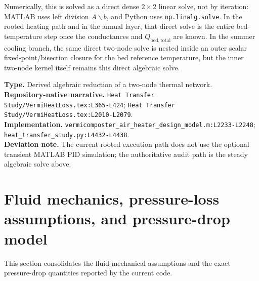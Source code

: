 \documentclass[11pt]{article}
\newcommand{\srcref}[1]{\nolinkurl{#1}}
\newcommand{\filepath}[1]{\nolinkurl{#1}}
\newcommand{\code}[1]{\nolinkurl{#1}}
\begin{document}
Numerically, this is solved as a direct dense \(2\times 2\) linear solve, not by iteration: MATLAB uses left division \(A\backslash b\), and Python uses \code{np.linalg.solve}. In the rooted heating path and in the annual layer, that direct solve is the entire bed-temperature step once the conductances and \(Q_{\mathrm{bed,total}}\) are known. In the summer cooling branch, the same direct two-node solve is nested inside an outer scalar fixed-point/bisection closure for the bed reference temperature, but the inner two-node kernel itself remains this direct algebraic solve.

\textbf{Type.} Derived algebraic reduction of a two-node thermal network. \\
\textbf{Repository-native narrative.} \filepath{Heat Transfer Study/VermiHeatLoss.tex:L365-L424}; \filepath{Heat Transfer Study/VermiHeatLoss.tex:L2010-L2079}. \\
\textbf{Implementation.} \srcref{vermicomposter_air_heater_design_model.m:L2233-L2248}; \srcref{heat_transfer_study.py:L4432-L4438}. \\
\textbf{Deviation note.} The current rooted execution path does not use the optional transient MATLAB PID simulation; the authoritative audit path is the steady algebraic solve above.

\section{Fluid mechanics, pressure-loss assumptions, and pressure-drop model}
\label{sec:fluid_mechanics}
This section consolidates the fluid-mechanical assumptions and the exact pressure-drop quantities reported by the current code.
\end{document}
